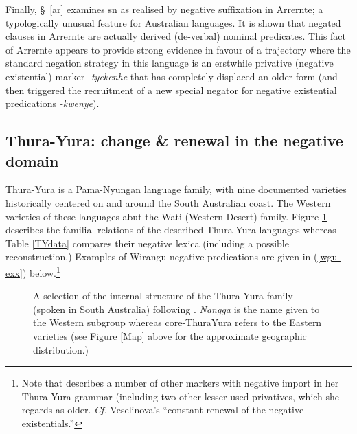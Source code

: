 Finally, §~\ref{ar} examines \acrlong{sn} as realised by negative suffixation in Arrernte; a typologically unusual feature for Australian languages. It is shown that negated clauses in Arrernte are actually derived (de-verbal) nominal predicates. This fact of Arrernte appears to provide strong evidence in favour of a trajectory where the standard negation strategy in this language is an erstwhile privative (negative existential) marker \textit{-tye\textdblhyphen kenhe} that has completely displaced an older form (and then triggered the recruitment of a new special negator for negative existential predications \textit{-kwenye}).




\subsection{Thura-Yura: change \& renewal in the negative domain}\label{TY}

Thura-Yura is a Pama-Nyungan language family, with nine documented varieties historically centered on and around the South Australian coast. The Western varieties of these languages abut the Wati (Western Desert) family. Figure \ref{TY-tree} describes the familial relations of the described Thura-Yura languages whereas Table \ref{TYdata} compares their negative lexica (including a possible reconstruction.) Examples of Wirangu negative predications are given in (\ref{wgu-exx}) below.\footnote{Note that \citep[57]{Hercus1999} describes a number of other markers with negative import in her Thura-Yura grammar (including two other lesser-used privatives, which she regards as older. \textit{Cf.} Veselinova's \citeyearpar[173]{Veselinova2016} ``constant renewal of the negative existentials.''}



	\begin{figure}[h]\centering
		\caption[\textsc{phylogeny.} Subgrouping in Thura-Yura]{A selection of the internal structure of the Thura-Yura family (spoken in South Australia) following \citealt[183]{Simpson2004}. \textit{Nangga} is the name given to the Western subgroup whereas core-ThuraYura refers to the Eastern varieties (see Figure \ref{Map} above for the approximate geographic distribution.)}\label{TY-tree}\small
	\end{figure}


